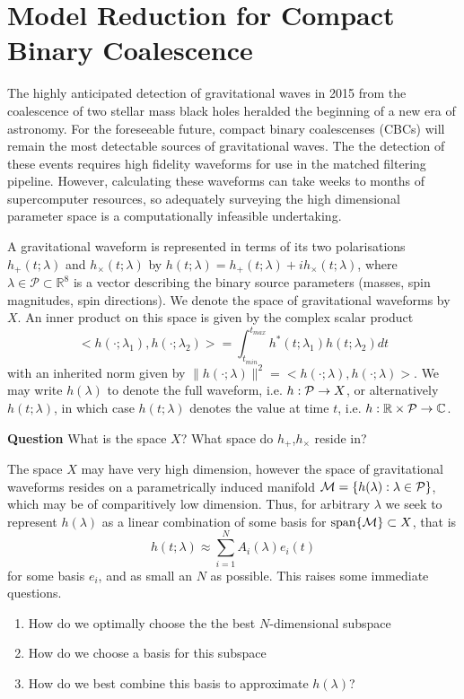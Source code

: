 %
%

\chapter{Model Reduction for Compact Binary Coalescence}

The highly anticipated detection of gravitational waves in 2015 from the coalescence of two stellar mass black holes heralded the beginning of a new era of astronomy. For the foreseeable future, compact binary coalescenses (CBCs) will remain the most detectable sources of gravitational waves. The the detection of these events requires high fidelity waveforms for use in the matched filtering pipeline. However, calculating these waveforms can take weeks to months of supercomputer resources, so adequately surveying the high dimensional parameter space is a computationally infeasible undertaking.

A gravitational waveform is represented in terms of its two polarisations $h_+(t;\lambda)$ and $h_\times(t;\lambda)$ by $h(t;\lambda)=h_+(t;\lambda)+ih_\times(t;\lambda)$, where $\lambda \in \mathcal{P} \subset \mathbb{R}^8$ is a vector describing the binary source parameters (masses, spin magnitudes, spin directions). We denote the space of gravitational waveforms by $X$. An inner product on this space is given by the complex scalar product 
\begin{equation}
<h(\cdot; \lambda_1), h(\cdot; \lambda_2)> = \int^{t_{max}}_{t_{min}} h^*(t; \lambda_1) h(t;\lambda_2) dt
\end{equation}
with an inherited norm given by $\| h(\cdot;\lambda) \|^2 = <h(\cdot; \lambda), h(\cdot; \lambda)>$. We may write $h(\lambda)$ to denote the full waveform, i.e. $h:\mathcal{P} \rightarrow X$, or alternatively $h(t;\lambda)$, in which case $h(t;\lambda)$ denotes the value at time $t$, i.e. $h: \mathbb{R} \times \mathcal{P} \rightarrow \mathbb{C}$. 

\textbf{Question} What is the space $X$? What space do $h_+$,$h_\times$ reside in?

The space $X$ may have very high dimension, however the space of gravitational waveforms resides on a parametrically induced manifold $\mathcal{M}=\{ h(\lambda) : \lambda \in \mathcal{P}\}$, which may be of comparitively low dimension. Thus, for arbitrary $\lambda$ we seek to represent $h(\lambda)$ as a linear combination of some basis for $\mbox{span}\{\mathcal{M} \}\subset X$, that is 
\begin{equation}
h(t;\lambda) \approx \sum_{i=1}^N A_i (\lambda) e_i(t)
\end{equation}
for some basis $e_i$, and as small an $N$ as possible. This raises some immediate questions.
\begin{enumerate}
\item How do we optimally choose the the best $N$-dimensional subspace
\item How do we choose a basis for this subspace
\item How do we best combine this basis to approximate $h(\lambda)$? 
\end{enumerate}

